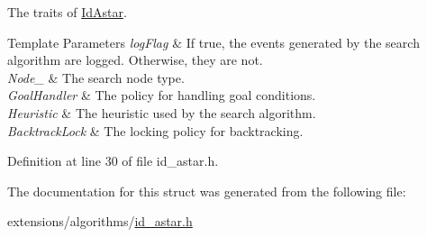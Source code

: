 The traits of \hyperlink{structIdAstar}{Id\+Astar}. 


\begin{DoxyTemplParams}{Template Parameters}
{\em log\+Flag} & If {\ttfamily true}, the events generated by the search algorithm are logged. Otherwise, they are not. \\
\hline
{\em Node\+\_\+} & The search node type. \\
\hline
{\em Goal\+Handler} & The policy for handling goal conditions. \\
\hline
{\em Heuristic} & The heuristic used by the search algorithm. \\
\hline
{\em Backtrack\+Lock} & The locking policy for backtracking. \\
\hline
\end{DoxyTemplParams}


Definition at line 30 of file id\+\_\+astar.\+h.



The documentation for this struct was generated from the following file\+:\begin{DoxyCompactItemize}
\item 
extensions/algorithms/\hyperlink{id__astar_8h}{id\+\_\+astar.\+h}\end{DoxyCompactItemize}
